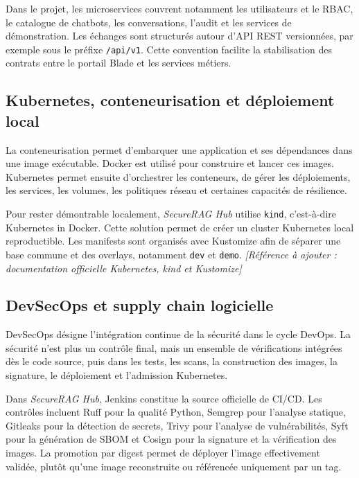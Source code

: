 Dans le projet, les microservices couvrent notamment les utilisateurs et le RBAC, le catalogue de chatbots, les conversations, l'audit et les services de démonstration. Les échanges sont structurés autour d'API REST versionnées, par exemple sous le préfixe \texttt{/api/v1}. Cette convention facilite la stabilisation des contrats entre le portail Blade et les services métiers.

\subsection{Kubernetes, conteneurisation et déploiement local}

La conteneurisation permet d'embarquer une application et ses dépendances dans une image exécutable. Docker est utilisé pour construire et lancer ces images. Kubernetes permet ensuite d'orchestrer les conteneurs, de gérer les déploiements, les services, les volumes, les politiques réseau et certaines capacités de résilience.

Pour rester démontrable localement, \textit{SecureRAG Hub} utilise \texttt{kind}, c'est-à-dire Kubernetes in Docker. Cette solution permet de créer un cluster Kubernetes local reproductible. Les manifests sont organisés avec Kustomize afin de séparer une base commune et des overlays, notamment \texttt{dev} et \texttt{demo}. \textit{[Référence à ajouter : documentation officielle Kubernetes, kind et Kustomize]}

\subsection{DevSecOps et supply chain logicielle}

DevSecOps désigne l'intégration continue de la sécurité dans le cycle DevOps. La sécurité n'est plus un contrôle final, mais un ensemble de vérifications intégrées dès le code source, puis dans les tests, les scans, la construction des images, la signature, le déploiement et l'admission Kubernetes.

Dans \textit{SecureRAG Hub}, Jenkins constitue la source officielle de CI/CD. Les contrôles incluent Ruff pour la qualité Python, Semgrep pour l'analyse statique, Gitleaks pour la détection de secrets, Trivy pour l'analyse de vulnérabilités, Syft pour la génération de SBOM et Cosign pour la signature et la vérification des images. La promotion par digest permet de déployer l'image effectivement validée, plutôt qu'une image reconstruite ou référencée uniquement par un tag.

